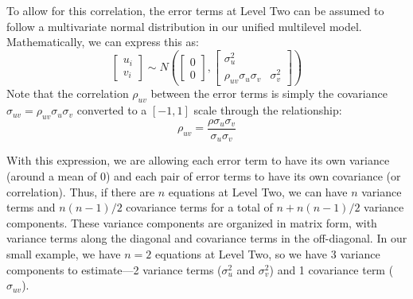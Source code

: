 \documentclass[
]{krantz}
\begin{document}
To allow for this correlation, the error terms at Level Two can be assumed to follow a multivariate normal distribution in our unified multilevel model. Mathematically, we can express this as:
\[ \left[ \begin{array}{c}
            u_{i} \\ v_{i}
          \end{array}  \right] \sim N \left( \left[
          \begin{array}{c}
            0 \\ 0
          \end{array} \right], \left[
          \begin{array}{cc}
            \sigma_{u}^{2} & \\
            \rho_{uv}\sigma_{u}\sigma_v & \sigma_{v}^{2}
          \end{array} \right] \right) \]
Note that the correlation \(\rho_{uv}\) between the error terms is simply the covariance \(\sigma_{uv}=\rho_{uv}\sigma_{u}\sigma_{v}\) converted to a \([-1,1]\) scale through the relationship:
\begin{equation}
\rho_{uv} = \frac{\rho\sigma_{u}\sigma_{v}}{\sigma_{u}\sigma_{v}}
\label{eq:cor}
\end{equation}

With this expression, we are allowing each error term to have its own variance (around a mean of 0) and each pair of error terms to have its own covariance (or correlation). Thus, if there are \(n\) equations at Level Two, we can have \(n\) variance terms and \(n(n-1)/2\) covariance terms for a total of \(n + n(n-1)/2\) variance components. These variance components are organized in matrix form, with variance terms along the diagonal and covariance terms in the off-diagonal. In our small example, we have \(n=2\) equations at Level Two, so we have 3 variance components to estimate---2 variance terms (\(\sigma_{u}^{2}\) and \(\sigma_{v}^{2}\)) and 1 covariance term (\(\sigma_{uv}\)).
\end{document}
